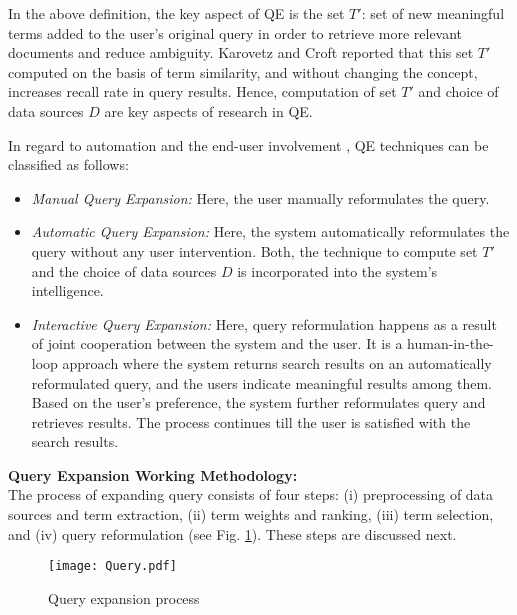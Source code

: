 In the above definition, the key aspect of QE is the set $T'$: set of new meaningful terms added to the user's original query in order to retrieve more relevant documents and reduce ambiguity. 
Karovetz and Croft \cite{krovetz1992lexical} reported that this set $T'$ computed on the basis of term similarity, and without changing the concept, increases recall rate in query results.  Hence, computation of set $T'$ and choice of data sources $D$ are key aspects of research in QE. 

In regard to automation and the end-user involvement \cite{efthimiadis1996query}, QE techniques can be classified as follows:
\begin{itemize}
	\item \emph{Manual Query Expansion:} Here, the user manually reformulates the query. 
	\item \emph{Automatic Query Expansion:} Here, the system automatically reformulates the query without any user intervention. Both, the technique to compute set $T'$ and the choice of data sources $D$ is incorporated into the system's intelligence. 
	\item \emph{Interactive Query Expansion:} Here,  query reformulation happens as a result of joint cooperation between the system and the user. It is a human-in-the-loop approach where the system returns search results on an automatically reformulated query, and the users indicate meaningful results among them. Based on the user's preference, the system further reformulates query and retrieves results. The process continues till the user is satisfied with the search results. 	
\end{itemize}
\textbf{Query Expansion Working Methodology:}\\
The process of expanding query consists of four steps: (i) preprocessing of data sources and term extraction, (ii) term weights and ranking, (iii) term selection, and (iv) query reformulation (see Fig. \ref{fig:2}). These steps are discussed next. 

\begin{figure}[h!]
	\centering 
	\texttt{[image: Query.pdf]}
	\caption{Query expansion process}
	\label{fig:2} 
\end{figure}


